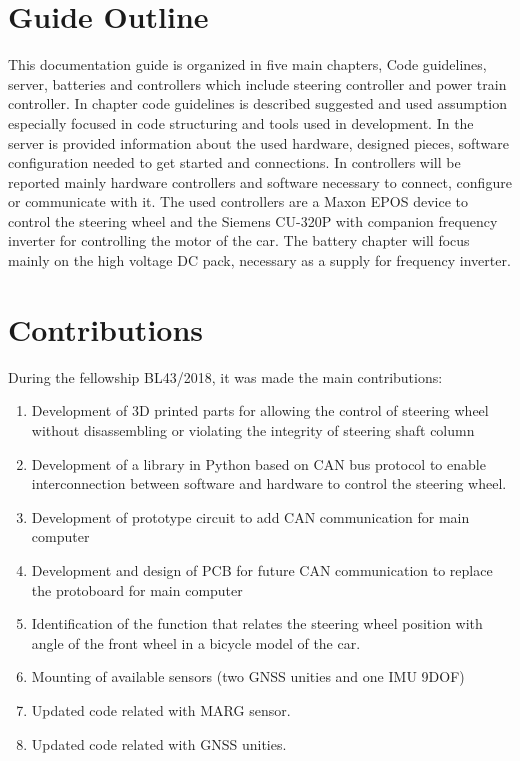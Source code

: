 \section{Guide Outline}
\label{section:outline} 

This documentation guide is organized in five main chapters, Code guidelines, server, batteries and controllers which include steering controller and power train controller.
In chapter code guidelines is described suggested and used assumption especially focused in code structuring and tools used in development.
In the server is provided information about the used hardware, designed pieces, software configuration needed to get started and connections.
In controllers will be reported mainly hardware controllers and software necessary to connect, configure  or communicate with it. The used controllers are a Maxon \gls{EPOS} device to control the steering wheel and the Siemens CU-320P with companion frequency inverter for controlling the motor of the car.
The battery chapter will focus mainly on the high voltage \gls{DC} pack, necessary as a supply for frequency inverter.


 

\section{Contributions}
\label{section:contributions}

During the fellowship BL43/2018, it was made the main contributions:
\begin{enumerate}
	\tightlist
	\item Development of 3D printed parts for allowing the control of steering wheel without disassembling or violating the integrity of steering shaft column
	\item Development of a library in Python based on CAN bus protocol to enable interconnection between software and hardware to control the steering wheel.
	\item Development of prototype circuit to add CAN communication for main computer
	\item Development and design of \acrshort{PCB} for future CAN communication to replace the protoboard for main computer
	\item Identification of the function that relates the steering wheel position with angle of the front wheel in a bicycle model of the car.
	\item Mounting of available sensors (two  \acrshort{GNSS} unities and one \acrshort{IMU} \acrshort{9DOF})
	\item Updated code related with \acrshort{MARG} sensor.
	\item Updated code related with \acrshort{GNSS} unities.
\end{enumerate}

